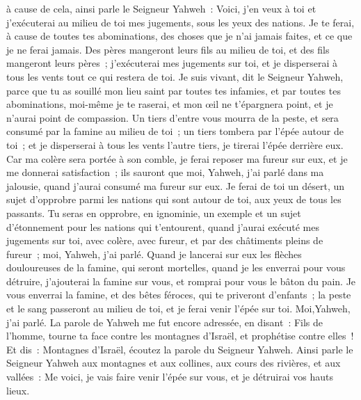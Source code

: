 \begin{multicols}{2}
à cause de cela, ainsi parle le Seigneur Yahweh~: Voici, j'en veux à toi et j'exécuterai au milieu de toi mes jugements, sous les yeux des nations.
Je te ferai, à cause de toutes tes abominations, des choses que je n'ai jamais faites, et ce que je ne ferai jamais.
Des pères mangeront leurs fils au milieu de toi, et des fils mangeront leurs pères~; j'exécuterai mes jugements sur toi, et je disperserai à tous les vents tout ce qui restera de toi.
Je suis vivant, dit le Seigneur Yahweh, parce que tu as souillé mon lieu saint par toutes tes infamies, et par toutes tes abominations, moi-même je te raserai, et mon œil ne t'épargnera point, et je n'aurai point de compassion.
Un tiers d'entre vous mourra de la peste, et sera consumé par la famine au milieu de toi~; un tiers tombera par l'épée autour de toi~; et je disperserai à tous les vents l'autre tiers, je tirerai l'épée derrière eux.
Car ma colère sera portée à son comble, je ferai reposer ma fureur sur eux, et je me donnerai satisfaction~; ils sauront que moi, Yahweh, j'ai parlé dans ma jalousie, quand j'aurai consumé ma fureur sur eux.
Je ferai de toi un désert, un sujet d'opprobre parmi les nations qui sont autour de toi, aux yeux de tous les passants.
Tu seras en opprobre, en ignominie, un exemple et un sujet d'étonnement pour les nations qui t'entourent, quand j'aurai exécuté mes jugements sur toi, avec colère, avec fureur, et par des châtiments pleins de fureur~; moi, Yahweh, j'ai parlé.
Quand je lancerai sur eux les flèches douloureuses de la famine, qui seront mortelles, quand je les enverrai pour vous détruire, j'ajouterai la famine sur vous, et romprai pour vous le bâton du pain.
Je vous enverrai la famine, et des bêtes féroces, qui te priveront d'enfants~; la peste et le sang passeront au milieu de toi, et je ferai venir l'épée sur toi. Moi,Yahweh, j'ai parlé.
\VerseOne{}La parole de Yahweh me fut encore adressée, en disant~:
Fils de l'homme, tourne ta face contre les montagnes d'Israël, et prophétise contre elles~!
Et dis~: Montagnes d'Israël, écoutez la parole du Seigneur Yahweh. Ainsi parle le Seigneur Yahweh aux montagnes et aux collines, aux cours des rivières, et aux vallées~: Me voici, je vais faire venir l'épée sur vous, et je détruirai vos hauts lieux.

\end{multicols}
